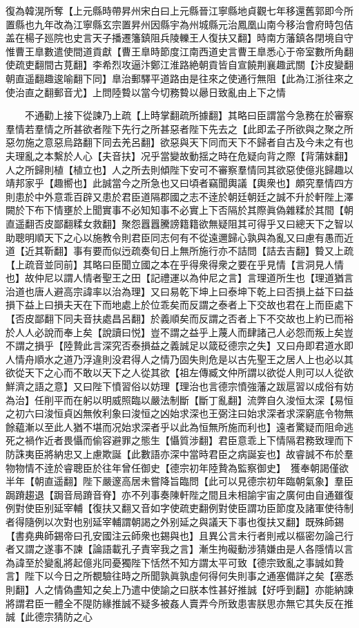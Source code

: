 復為韓滉所奪【上元縣時帶昇州宋白曰上元縣晉江寧縣地貞觀七年移還舊郭即今所置縣也九年改為江寧縣玄宗置昇州因縣宇為州城縣元治鳳凰山南今移治會府時包佶盖在楊子廵院也史言天子播遷籓鎮阻兵陵轢王人復扶又翻】時南方藩鎮各閉境自守惟曹王臯數遣使間道貢獻【曹王臯時節度江南西道史言曹王臯悉心于帝室數所角翻使疏吏翻間古莧翻】李希烈攻逼汴鄭江淮路絶朝貢皆自宣饒荆襄趣武關【汴皮變翻朝直遥翻趣逡喻翻下同】臯治郵驛平道路由是往來之使通行無阻【此為江浙往來之使治直之翻郵音尤】上問陸䞇以當今切務䞇以曏日致亂由上下之情

　　不通勸上接下從諫乃上疏【上時掌翻疏所據翻】其略曰臣謂當今急務在於審察羣情若羣情之所甚欲者陛下先行之所甚惡者陛下先去之【此即孟子所欲與之聚之所惡勿施之意惡烏路翻下同去羌呂翻】欲惡與天下同而天下不歸者自古及今未之有也夫理亂之本繫於人心【夫音扶】况乎當變故動揺之時在危疑向背之際【背蒲妺翻】人之所歸則植【植立也】人之所去則傾陛下安可不審察羣情同其欲惡使億兆歸趣以靖邦家乎【趣嚮也】此誠當今之所急也又曰頃者竊聞輿議【輿衆也】頗究羣情四方則患於中外意乖百辟又患於君臣道隔郡國之志不逹於朝廷朝廷之誠不升於軒陛上澤闕於下布下情壅於上聞實事不必知知事不必實上下否隔於其際眞偽雜糅於其間【朝直遥翻否皮鄙翻糅女救翻】聚怨囂囂騰謗籍籍欲無疑阻其可得乎又曰總天下之智以助聰明順天下之心以施教令則君臣同志何有不從遠邇歸心孰與為亂又曰慮有愚而近道【近其靳翻】事有要而似迃疏奏旬日上無所施行亦不詰問【詰去吉翻】䞇又上疏【上疏音並同前】其略曰臣聞立國之本在乎得衆得衆之要在乎見情【言洞見人情也】故仲尼以謂人情者聖王之田【記禮運以為仲尼之言】言理道所生也【理道猶言治道也唐人避高宗諱率以治為理】又曰易乾下坤上曰泰坤下乾上曰否損上益下曰益損下益上曰損夫天在下而地處上於位乖矣而反謂之泰者上下交故也君在上而臣處下【否皮鄙翻下同夫音扶處昌呂翻】於義順矣而反謂之否者上下不交故也上約已而裕於人人必說而奉上矣【說讀曰悦】豈不謂之益乎上蔑人而肆諸己人必怨而叛上矣豈不謂之損乎【陸贄此言深究否泰損益之義誠足以箴砭德宗之失】又曰舟即君道水即人情舟順水之道乃浮違則没君得人之情乃固失則危是以古先聖王之居人上也必以其欲從天下之心而不敢以天下之人從其欲【祖左傳臧文仲所謂以欲從人則可以人從欲鮮濟之語之意】又曰陛下憤習俗以妨理【理治也言德宗憤強藩之跋扈習以成俗有妨為治】任削平而在躬以明威照臨以嚴法制斷【斷丁亂翻】流弊自久浚恒太深【易恒之初六曰浚恒貞凶無攸利象曰浚恒之凶始求深也王弼注曰始求深者求深窮底令物無餘藴漸以至此人猶不堪而况始求深者乎以此為恒無所施而利也】遠者驚疑而阻命逃死之禍作近者畏懾而偷容避罪之態生【懾質涉翻】君臣意乖上下情隔君務致理而下防誅夷臣將納忠又上慮欺誕【此數語亦深中當時君臣之病誕妄也】故睿誠不布於羣物物情不逹於睿聰臣於往年曾任御史【德宗初年陸贄為監察御史】　獲奉朝謁僅欲半年【朝直遥翻】陛下嚴邃高居未嘗降旨臨問【此可以見德宗初年臨朝氣象】羣臣跼蹐趨退【跼音局蹐音脊】亦不列事奏陳軒陛之間且未相諭宇宙之廣何由自通雖復例對使臣别延宰輔【復扶又翻又音如字使疏吏翻例對使臣謂功臣節度及諸軍使待制者得隨例以次對也别延宰輔謂朝謁之外别延之與議天下事也復扶又翻】既殊師錫【書堯典師錫帝曰孔安國注云師衆也錫與也】且異公言未行者則戒以樞密勿論己行者又謂之遂事不諫【論語載孔子責宰我之言】漸生拘礙動涉猜嫌由是人各隱情以言為諱至於變亂將起億兆同憂獨陛下恬然不知方謂太平可致【德宗致亂之事誠如贄言】陛下以今日之所覩驗往時之所聞孰眞孰虛何得何失則事之通塞備詳之矣【塞悉則翻】人之情偽盡知之矣上乃遣中使諭之曰朕本性甚好推誠【好呼到翻】亦能納諫將謂君臣一體全不隄防緣推誠不疑多被姦人賣弄今所致患害朕思亦無它其失反在推誠【此德宗猜防之心